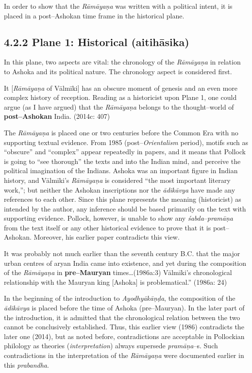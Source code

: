 In order to show that the \textit{Rāmāyaṇa} was written with a political intent, it is placed in a post–Ashokan time frame in the historical plane.


\subsection*{4.2.2 Plane 1: Historical (aitihāsika)}

In this plane, two aspects are vital: the chronology of the \textit{Rāmāyaṇa} in relation to Ashoka and its political nature. The chronology aspect is considered first.

\begin{myquote}
It [\textit{Rāmāyaṇa} of Vālmīki] has an obscure moment of genesis and an even more complex history of reception. Reading as a historicist upon Plane 1, one could argue (as I have argued) that the \textit{Rāmāyaṇa} belongs to the thought–world of \textbf{post–Ashokan} India. (2014c: 407)
\end{myquote}

The \textit{Rāmāyaṇa} is placed one or two centuries before the Common Era with no supporting textual evidence. From 1985 (post–\textit{Orientalism} period), motifs such as “obscure” and “complex” appear repeatedly in papers, and it means that Pollock is going to “see thorough” the texts and into the Indian mind, and perceive the political imagination of the Indians. Ashoka was an important figure in Indian history, and Vālmīki’s \textit{Rāmāyaṇa }is considered “the most important literary work,”; but neither the Ashokan inscriptions nor the \textit{ādikāvya} have made any references to each other. Since this plane represents the meaning (historicist) as intended by the author, any inference should be based primarily on the text with supporting evidence. Pollock, however, is unable to show any\textit{ śabda}–\textit{pramāṇa} from the text itself or any other historical evidence to prove that it is post–Ashokan. Moreover, his earlier paper contradicts this view.

\begin{myquote}
It was probably not much earlier than the seventh century B.C. that the major urban centres of aryan India came into existence, and yet during the composition of the \textit{Rāmāyaṇa} in \textbf{pre–Mauryan} times…(1986a:3) Vālmīki’s chronological relationship with the Mauryan king [Ashoka] is problematical.” (1986a: 24)
\end{myquote}

In the beginning of the introduction to \textit{Ayodhyākāṇḍa}, the composition of the \textit{ādikāvya} is placed before the time of Ashoka (pre–Mauryan). In the later part of the introduction, it is admitted that the chronological relation between the two cannot be conclusively established. Thus, this earlier view (1986) contradicts the later one (2014), but as noted before, contradictions are acceptable in Pollockian philology as theories (\textit{interpretation}) always supersede \textit{pramāṇa}–s. Such contradictions in the interpretation of the \textit{Rāmāyaṇa} were documented earlier in this \textit{prabandha}.

